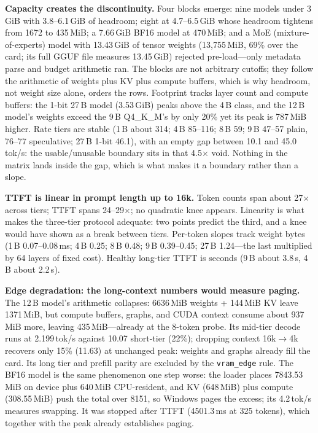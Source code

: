 \documentclass[letterpaper,twocolumn,10pt]{article}
\begin{document}
\textbf{Capacity creates the discontinuity.} Four blocks emerge: nine models
under 3\,GiB with 3.8--6.1\,GiB of headroom; eight at 4.7--6.5\,GiB whose
headroom tightens from 1672 to 435\,MiB; a 7.66\,GiB BF16 model at 470\,MiB;
and a MoE (mixture-of-experts) model with 13.43\,GiB of tensor weights (13{,}755\,MiB, 69\% over
the card; its full GGUF file measures 13.45\,GiB) rejected
pre-load---only metadata parse and budget arithmetic ran. The blocks are not
arbitrary cutoffs; they follow the arithmetic of weights plus KV plus compute
buffers, which is why headroom, not weight size alone, orders the rows.
Footprint tracks layer count and compute buffers: the 1-bit 27\,B
model (3.53\,GiB) peaks above the 4\,B class, and the 12\,B model's weights
exceed the 9\,B Q4\_K\_M's by only 20\% yet its peak is 787\,MiB higher. Rate
tiers are stable (1\,B about 314; 4\,B 85--116; 8\,B 59; 9\,B 47--57 plain,
76--77 speculative; 27\,B 1-bit 46.1), with an empty gap between 10.1 and
45.0\,tok/s: the usable/unusable boundary sits in that 4.5$\times$ void.
Nothing in the matrix lands inside the gap, which is what makes it a boundary
rather than a slope.

\textbf{TTFT is linear in prompt length up to 16k.} Token counts span about
27$\times$ across tiers; TTFT spans 24--29$\times$; no quadratic knee appears.
Linearity is what makes the three-tier protocol adequate: two points predict
the third, and a knee would have shown as a break between tiers.
Per-token slopes track weight bytes (1\,B 0.07--0.08\,ms; 4\,B 0.25; 8\,B
0.48; 9\,B 0.39--0.45; 27\,B 1.24---the last multiplied by 64 layers of fixed
cost). Healthy long-tier TTFT is seconds (9\,B about 3.8\,s, 4\,B about
2.2\,s).

\textbf{Edge degradation: the long-context numbers would measure paging.} The
12\,B model's arithmetic collapses: 6636\,MiB weights + 144\,MiB KV leave
1371\,MiB, but compute buffers, graphs, and CUDA context consume about
937\,MiB more, leaving 435\,MiB---already at the 8-token probe. Its mid-tier
decode runs at 2.199\,tok/s against 10.07 short-tier (22\%); dropping context
16k$\rightarrow$4k recovers only 15\% (11.63) at unchanged peak: weights and
graphs already fill the card. Its long tier and prefill parity are excluded by
the \texttt{vram\_edge} rule. The BF16 model is the same phenomenon one step
worse: the loader places 7843.53\,MiB on device plus 640\,MiB CPU-resident,
and KV (648\,MiB) plus compute (308.55\,MiB) push the total over 8151, so
Windows pages the excess; its 4.2\,tok/s measures swapping. It was stopped
after TTFT (4501.3\,ms at 325 tokens), which together with the peak already
establishes paging.
\end{document}
